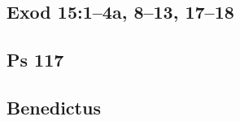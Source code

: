 \subsection{Exod 15:1--4a, 8--13, 17--18}

{%
\parindent 0pt
\noindent
\ifx\preLilyPondExample \undefined
\else
  \expandafter\preLilyPondExample
\fi
\def\lilypondbook{}%

\ifx\postLilyPondExample \undefined
\else
  \expandafter\postLilyPondExample
\fi
}

\subsection{Ps 117}

{%
\parindent 0pt
\noindent
\ifx\preLilyPondExample \undefined
\else
  \expandafter\preLilyPondExample
\fi
\def\lilypondbook{}%

\ifx\postLilyPondExample \undefined
\else
  \expandafter\postLilyPondExample
\fi
}

\subsection{Benedictus}

{%
\parindent 0pt
\noindent
\ifx\preLilyPondExample \undefined
\else
  \expandafter\preLilyPondExample
\fi
\def\lilypondbook{}%

\ifx\postLilyPondExample \undefined
\else
  \expandafter\postLilyPondExample
\fi
}



